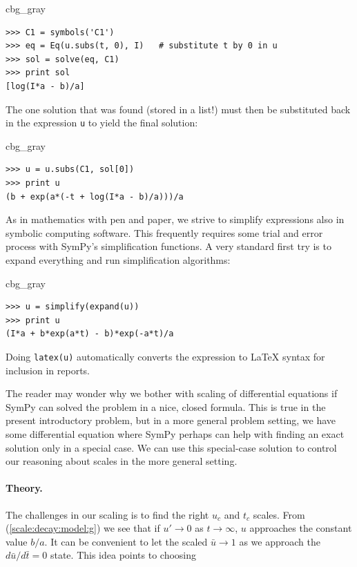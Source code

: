 \documentclass[graybox,envcountchap,sectrefs,final]{svmonodo}
\newenvironment{_cod_tight}[1]{
   \def\FrameCommand{\colorbox{#1}}
   \FrameRule0.6pt\MakeFramed {\FrameRestore}\vskip3mm}
   {\vskip0mm\endMakeFramed}
\newenvironment{cod}[1]{
\bgroup\rmfamily
\fboxsep=0mm\relax
\begin{_cod_tight}{#1}
\list{}{\parsep=-2mm\parskip=0mm\topsep=0pt\leftmargin=2mm
\rightmargin=2\leftmargin\leftmargin=4pt\relax}
\item\relax}
{\endlist\end{_cod_tight}\egroup}
\newenvironment{notice_mdfboxadmon}[1][]{
\begin{notice_mdfboxmdframed}[frametitle=#1]
}
{
\end{notice_mdfboxmdframed}
}
\begin{document}
\begin{notice_mdfboxadmon}
\begin{cod}{cbg_gray}\begin{Verbatim}[numbers=none,fontsize=\fontsize{9pt}{9pt},baselinestretch=0.95,xleftmargin=2mm]
>>> C1 = symbols('C1')
>>> eq = Eq(u.subs(t, 0), I)   # substitute t by 0 in u
>>> sol = solve(eq, C1)
>>> print sol
[log(I*a - b)/a]
\end{Verbatim}
\end{cod}
\noindent
The one solution that was found (stored in a list!)
must then be substituted back in the
expression \texttt{u} to yield the final solution:

\begin{cod}{cbg_gray}\begin{Verbatim}[numbers=none,fontsize=\fontsize{9pt}{9pt},baselinestretch=0.95,xleftmargin=2mm]
>>> u = u.subs(C1, sol[0])
>>> print u
(b + exp(a*(-t + log(I*a - b)/a)))/a
\end{Verbatim}
\end{cod}
\noindent
As in mathematics with pen and paper, we strive to simplify
expressions also in symbolic computing software.
This frequently requires some trial and error
process with SymPy's simplification functions. A very standard
first try is to expand everything and run simplification algorithms:

\begin{cod}{cbg_gray}\begin{Verbatim}[numbers=none,fontsize=\fontsize{9pt}{9pt},baselinestretch=0.95,xleftmargin=2mm]
>>> u = simplify(expand(u))
>>> print u
(I*a + b*exp(a*t) - b)*exp(-a*t)/a
\end{Verbatim}
\end{cod}
\noindent
Doing \texttt{latex(u)} automatically converts the expression to {\LaTeX} syntax
for inclusion in reports.
\end{notice_mdfboxadmon}



The reader may wonder why we bother with scaling of differential
equations if SymPy can solved the problem in a nice, closed
formula. This is true in the present introductory problem, but in a
more general problem setting, we have some differential equation where
SymPy perhaps can help with finding an exact solution only in a
special case. We can use this special-case solution to control our
reasoning about scales in the more general setting.

\paragraph{Theory.}
The challenges in our scaling is to find the right $u_c$ and $t_c$
scales. From (\ref{scale:decay:model:g}) we see that if $u'\rightarrow 0$
as $t\rightarrow\infty$, $u$ approaches the constant value $b/a$. It can be
convenient to let the scaled $\bar u\rightarrow 1$ as
we approach the $d\bar u/d\bar t = 0$ state. This idea points to choosing
\end{document}
